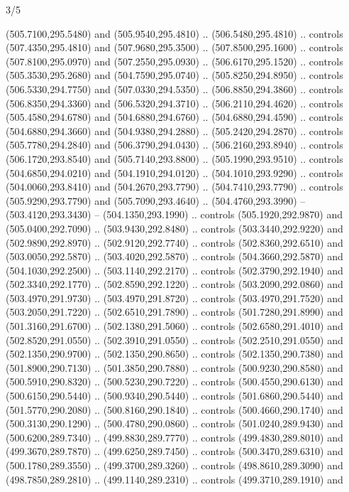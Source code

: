 \begin{flagdescription}{3/5}
\begin{scope}[shift={(0.5\flaglength,0.5\flagwidth)},scale=\flagwidth/1075]
\begin{scope}[y=0.80pt, x=0.80pt, yscale=-2.37, xscale=2.37,xshift=-402,yshift=-230.4]
  (505.7100,295.5480) and (505.9540,295.4810) .. (506.5480,295.4810) .. controls
  (507.4350,295.4810) and (507.9680,295.3500) .. (507.8500,295.1600) .. controls
  (507.8100,295.0970) and (507.2550,295.0930) .. (506.6170,295.1520) .. controls
  (505.3530,295.2680) and (504.7590,295.0740) .. (505.8250,294.8950) .. controls
  (506.5330,294.7750) and (507.0330,294.5350) .. (506.8850,294.3860) .. controls
  (506.8350,294.3360) and (506.5320,294.3710) .. (506.2110,294.4620) .. controls
  (505.4580,294.6780) and (504.6880,294.6760) .. (504.6880,294.4590) .. controls
  (504.6880,294.3660) and (504.9380,294.2880) .. (505.2420,294.2870) .. controls
  (505.7780,294.2840) and (506.3790,294.0430) .. (506.2160,293.8940) .. controls
  (506.1720,293.8540) and (505.7140,293.8800) .. (505.1990,293.9510) .. controls
  (504.6850,294.0210) and (504.1910,294.0120) .. (504.1010,293.9290) .. controls
  (504.0060,293.8410) and (504.2670,293.7790) .. (504.7410,293.7790) .. controls
  (505.9290,293.7790) and (505.7090,293.4640) .. (504.4760,293.3990) --
  (503.4120,293.3430) -- (504.1350,293.1990) .. controls (505.1920,292.9870) and
  (505.0400,292.7090) .. (503.9430,292.8480) .. controls (503.3440,292.9220) and
  (502.9890,292.8970) .. (502.9120,292.7740) .. controls (502.8360,292.6510) and
  (503.0050,292.5870) .. (503.4020,292.5870) .. controls (504.3660,292.5870) and
  (504.1030,292.2500) .. (503.1140,292.2170) .. controls (502.3790,292.1940) and
  (502.3340,292.1770) .. (502.8590,292.1220) .. controls (503.2090,292.0860) and
  (503.4970,291.9730) .. (503.4970,291.8720) .. controls (503.4970,291.7520) and
  (503.2050,291.7220) .. (502.6510,291.7890) .. controls (501.7280,291.8990) and
  (501.3160,291.6700) .. (502.1380,291.5060) .. controls (502.6580,291.4010) and
  (502.8520,291.0550) .. (502.3910,291.0550) .. controls (502.2510,291.0550) and
  (502.1350,290.9700) .. (502.1350,290.8650) .. controls (502.1350,290.7380) and
  (501.8900,290.7130) .. (501.3850,290.7880) .. controls (500.9230,290.8580) and
  (500.5910,290.8320) .. (500.5230,290.7220) .. controls (500.4550,290.6130) and
  (500.6150,290.5440) .. (500.9340,290.5440) .. controls (501.6860,290.5440) and
  (501.5770,290.2080) .. (500.8160,290.1840) .. controls (500.4660,290.1740) and
  (500.3130,290.1290) .. (500.4780,290.0860) .. controls (501.0240,289.9430) and
  (500.6200,289.7340) .. (499.8830,289.7770) .. controls (499.4830,289.8010) and
  (499.3670,289.7870) .. (499.6250,289.7450) .. controls (500.3470,289.6310) and
  (500.1780,289.3550) .. (499.3700,289.3260) .. controls (498.8610,289.3090) and
  (498.7850,289.2810) .. (499.1140,289.2310) .. controls (499.3710,289.1910) and

\end{scope}
\end{scope}
\end{flagdescription}
